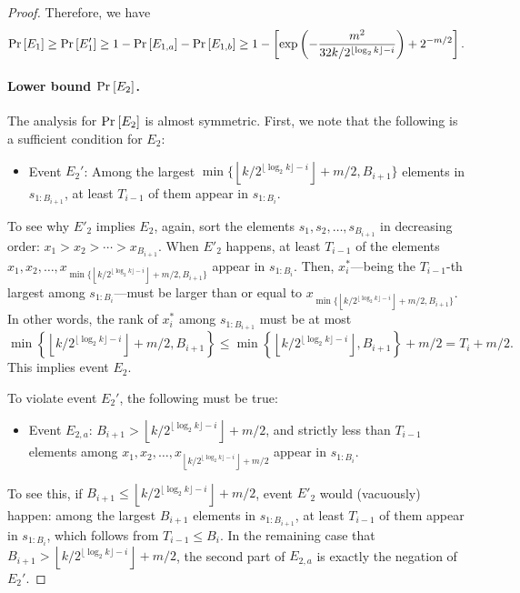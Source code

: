 \begin{proof}
Therefore, we have
\[
    \Pr_{}\left[E_1\right] 
\ge \Pr_{}\left[E'_1\right]
\ge 1 - \Pr_{}\left[E_{1,a}\right] - \Pr_{}\left[E_{1, b}\right]
\ge 1 - \left[\exp\left(-\frac{m^2}{32k/2^{\lfloor\log_2k\rfloor-i}}\right) + 2^{-m/2}\right].
\]


\paragraph{Lower bound $\Pr_{}\left[E_2\right]$.} The analysis for $\Pr_{}\left[E_2\right]$ is almost symmetric. First, we note that the following is a sufficient condition for $E_2$:
\begin{itemize}
    \item Event $E_{2}'$: Among the largest $\min\{\left\lfloor k/2^{\lfloor\log_2 k\rfloor - i}\right\rfloor + m/2, B_{i+1}\}$ elements in $s_{1:B_{i+1}}$, at least $T_{i-1}$ of them appear in $s_{1:B_i}$.
\end{itemize}
To see why $E'_2$ implies $E_2$, again, sort the elements $s_1, s_2, \ldots, s_{B_{i+1}}$ in decreasing order: $x_1 > x_2 > \cdots > x_{B_{i+1}}$. When $E'_2$ happens, at least $T_{i-1}$ of the elements $x_1, x_2, \ldots, x_{\min\{\left\lfloor k/2^{\lfloor\log_2 k\rfloor - i}\right\rfloor + m/2, B_{i+1}\}}$ appear in $s_{1:B_i}$. Then, $x_i^*$---being the $T_{i-1}$-th largest among $s_{1:B_i}$---must be larger than or equal to $x_{\min\{\left\lfloor k/2^{\lfloor\log_2 k\rfloor - i}\right\rfloor + m/2, B_{i+1}\}}$. In other words, the rank of $x^*_i$ among $s_{1:B_{i+1}}$ must be at most
\[
    \min\left\{\left\lfloor k/2^{\lfloor\log_2 k\rfloor - i}\right\rfloor + m/2, B_{i+1}\right\}
\le \min\left\{\left\lfloor k/2^{\lfloor\log_2 k\rfloor - i}\right\rfloor, B_{i+1}\right\} + m/2
=   T_i + m/2.
\]
This implies event $E_2$. 

To violate event $E_2'$, the following must be true:
\begin{itemize}
    \item Event $E_{2, a}$: $B_{i+1} > \left\lfloor k/2^{\lfloor\log_2 k\rfloor - i}\right\rfloor + m/2$, and  strictly less than $T_{i-1}$ elements among $x_1, x_2, \ldots, x_{\left\lfloor k/2^{\lfloor\log_2 k\rfloor - i}\right\rfloor + m/2}$ appear in $s_{1:B_i}$.
\end{itemize}
To see this, if $B_{i+1} \le \left\lfloor k/2^{\lfloor\log_2 k\rfloor - i}\right\rfloor + m/2$, event $E'_2$ would (vacuously) happen: among the largest $B_{i+1}$ elements in $s_{1:B_{i+1}}$, at least $T_{i-1}$ of them appear in $s_{1:B_i}$, which follows from $T_{i-1} \le B_i$. In the remaining case that $B_{i+1} > \left\lfloor k/2^{\lfloor\log_2 k\rfloor - i}\right\rfloor + m/2$, the second part of $E_{2, a}$ is exactly the negation of $E_{2}'$.


\end{proof}
